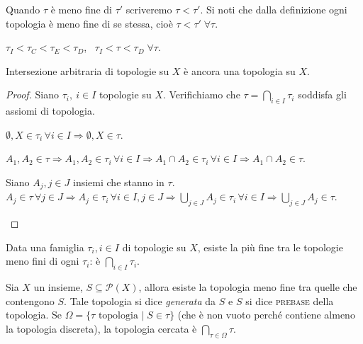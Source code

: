 \documentclass{article}
\begin{document}
Quando $\tau$ è meno fine di $\tau'$ scriveremo $\tau < \tau'$. Si noti che
dalla definizione ogni topologia è meno fine di se stessa, cioè $\tau < \tau'
\; \forall \tau$.

\begin{ex}
	$\tau_I < \tau_C < \tau_E < \tau_D$, \, $\tau_I < \tau < \tau_D \; \forall
	\tau$.
\end{ex}

\begin{lm}
	Intersezione arbitraria di topologie su $X$ è ancora una topologia su $X$.
\end{lm}

\begin{proof}
    Siano $\tau_i,\ i \in I$ topologie su $X$. Verifichiamo che $
    \tau=\bigcap_{i \in I} \tau_i$ soddisfa gli assiomi di topologia.

    \begin{nlist}
        \item $\emptyset, X \in \tau_i \, \forall i \in I \Rightarrow \emptyset,
        X \in \tau$.

        \item $A_1, A_2 \in \tau \Rightarrow A_1, A_2 \in \tau_i \, \forall i
        \in I \Rightarrow A_1 \cap A_2 \in \tau_i \, \forall i \in I \Rightarrow
        A_1 \cap A_2 \in \tau$.

        \item Siano $A_j, j \in J$ insiemi che stanno in $\tau$. \\
        $\displaystyle A_j \in \tau \, \forall j \in J \Rightarrow A_j \in
        \tau_i \, \forall i \in I, j \in J \Rightarrow {\bigcup_{j \in J} A_j
        \in \tau_i \, \forall i \in I} \Rightarrow {\bigcup_{j \in J} A_j \in
        \tau}$.
    \end{nlist}
\end{proof}

\begin{cor}
	Data una famiglia $\tau_i, i \in I$ di topologie su $X$, esiste la più fine
	tra le topologie meno fini di ogni $\tau_i$: è $\displaystyle \bigcap_{i \in
	I} \tau_i$.
\end{cor}

\begin{cor}
	Sia $X$ un insieme, $S \subseteq \mathcal{P}(X)$, allora esiste la topologia
	meno fine tra quelle che contengono $S$. Tale topologia si dice
	\textit{generata} da $S$ e $S$ si dice \textsc{prebase} della topologia. Se
	$\Omega= \{ \tau \text{ topologia } |\; S \in \tau \}$ (che è non vuoto
	perché contiene almeno la topologia discreta), la topologia cercata è
	$\displaystyle \bigcap_{\tau \in \Omega} \tau$.
\end{cor}
\end{document}
